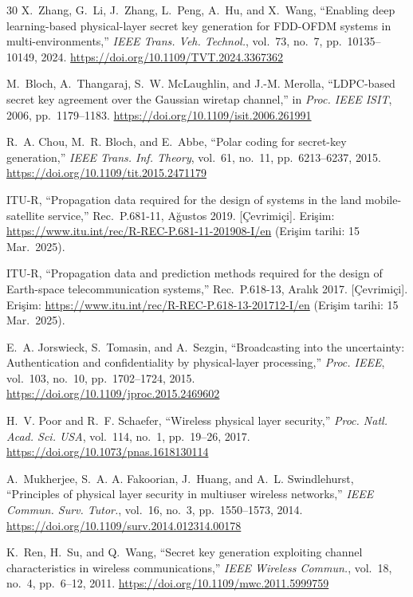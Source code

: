 \documentclass[conference,a4paper]{IEEEtran}
\begin{document}
\begin{thebibliography}{30}
X.~Zhang, G.~Li, J.~Zhang, L.~Peng, A.~Hu, and X.~Wang, ``Enabling deep learning-based physical-layer secret key generation for FDD-OFDM systems in multi-environments,'' \emph{IEEE Trans. Veh. Technol.}, vol.~73, no.~7, pp.~10135--10149, 2024.
\url{https://doi.org/10.1109/TVT.2024.3367362}

M.~Bloch, A.~Thangaraj, S.~W. McLaughlin, and J.-M. Merolla, ``LDPC-based secret key agreement over the Gaussian wiretap channel,'' in \emph{Proc. IEEE ISIT}, 2006, pp.~1179--1183.
\url{https://doi.org/10.1109/isit.2006.261991}

R.~A. Chou, M.~R. Bloch, and E.~Abbe, ``Polar coding for secret-key generation,'' \emph{IEEE Trans. Inf. Theory}, vol.~61, no.~11, pp.~6213--6237, 2015.
\url{https://doi.org/10.1109/tit.2015.2471179}

ITU-R, ``Propagation data required for the design of systems in the land mobile-satellite service,'' Rec.\ P.681-11, Ağustos 2019. [Çevrimiçi]. Erişim: \url{https://www.itu.int/rec/R-REC-P.681-11-201908-I/en} (Erişim tarihi: 15 Mar.\ 2025).

ITU-R, ``Propagation data and prediction methods required for the design of Earth-space telecommunication systems,'' Rec.\ P.618-13, Aralık 2017. [Çevrimiçi]. Erişim: \url{https://www.itu.int/rec/R-REC-P.618-13-201712-I/en} (Erişim tarihi: 15 Mar.\ 2025).

E.~A. Jorswieck, S.~Tomasin, and A.~Sezgin, ``Broadcasting into the uncertainty: Authentication and confidentiality by physical-layer processing,'' \emph{Proc. IEEE}, vol.~103, no.~10, pp.~1702--1724, 2015.
\url{https://doi.org/10.1109/jproc.2015.2469602}

H.~V. Poor and R.~F. Schaefer, ``Wireless physical layer security,'' \emph{Proc. Natl. Acad. Sci. USA}, vol.~114, no.~1, pp.~19--26, 2017.
\url{https://doi.org/10.1073/pnas.1618130114}

A.~Mukherjee, S.~A. A. Fakoorian, J.~Huang, and A.~L. Swindlehurst, ``Principles of physical layer security in multiuser wireless networks,'' \emph{IEEE Commun. Surv. Tutor.}, vol.~16, no.~3, pp.~1550--1573, 2014.
\url{https://doi.org/10.1109/surv.2014.012314.00178}

K.~Ren, H.~Su, and Q.~Wang, ``Secret key generation exploiting channel characteristics in wireless communications,'' \emph{IEEE Wireless Commun.}, vol.~18, no.~4, pp.~6--12, 2011.
\url{https://doi.org/10.1109/mwc.2011.5999759}


\end{thebibliography}
\end{document}
